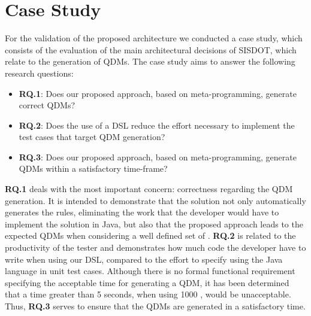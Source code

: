 \section{Case Study}
\label{sec:case_study} 


For the validation of the proposed architecture we conducted a case study, which consists of the evaluation of the main 
architectural decisions of SISDOT, which relate to the generation of QDMs. The case study aims to answer the 
following research questions:

\begin{itemize}

\item \textbf{RQ.1}: Does our proposed approach, based on meta-programming, generate correct QDMs?

\item \textbf{RQ.2}: Does the use of a DSL reduce the effort necessary to implement the test cases that target QDM generation? 

\item \textbf{RQ.3}: Does our proposed approach, based on meta-programming, generate QDMs within a satisfactory time-frame?

\end{itemize}


\textbf{RQ.1} deals with the most important concern: correctness regarding the QDM generation. It is intended 
to demonstrate that the solution not only automatically generates the rules, eliminating the work that the developer 
would have to implement the solution in Java, but also that the proposed approach leads to the expected QDMs when considering 
a well defined set of \callers.
\textbf{RQ.2} is related to the productivity of the tester and demonstrates how much code the 
developer have to write when using our DSL, compared to the effort to specify \callers using the Java language in 
unit test cases. Although there is no formal functional requirement specifying the  acceptable time for generating a QDM, 
it has been determined that a time greater than 5 seconds, when using 1000 \callers, would be unacceptable. 
Thus, \textbf{RQ.3} serves to ensure that the QDMs are generated in a satisfactory time.

